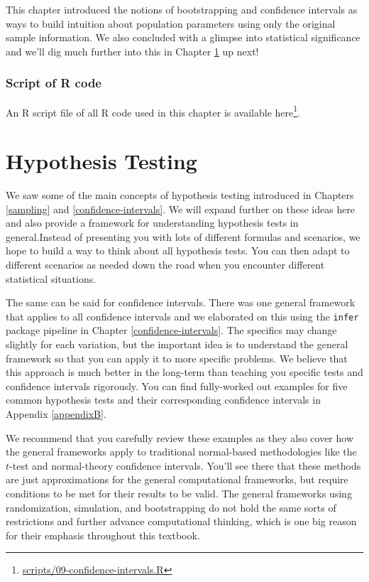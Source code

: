 \documentclass[12pt,]{krantz}
\renewcommand{\href}[2]{#2\footnote{\url{#1}}}
\begin{document}
This chapter introduced the notions of bootstrapping and confidence
intervals as ways to build intuition about population parameters using
only the original sample information. We also concluded with a glimpse
into statistical significance and we'll dig much further into this in
Chapter \ref{hypothesis-testing} up next!

\subsection{Script of R code}\label{script-of-r-code-6}

An R script file of all R code used in this chapter is available
\href{scripts/09-confidence-intervals.R}{here}.

\chapter{Hypothesis Testing}\label{hypothesis-testing}

We saw some of the main concepts of hypothesis testing introduced in
Chapters \ref{sampling} and \ref{confidence-intervals}. We will expand
further on these ideas here and also provide a framework for
understanding hypothesis tests in general.Instead of presenting you with
lots of different formulas and scenarios, we hope to build a way to
think about all hypothesis tests. You can then adapt to different
scenarios as needed down the road when you encounter different
statistical situations.

The same can be said for confidence intervals. There was one general
framework that applies to all confidence intervals and we elaborated on
this using the \texttt{infer} package pipeline in Chapter
\ref{confidence-intervals}. The specifics may change slightly for each
variation, but the important idea is to understand the general framework
so that you can apply it to more specific problems. We believe that this
approach is much better in the long-term than teaching you specific
tests and confidence intervals rigorously. You can find fully-worked out
examples for five common hypothesis tests and their corresponding
confidence intervals in Appendix \ref{appendixB}.

We recommend that you carefully review these examples as they also cover
how the general frameworks apply to traditional normal-based
methodologies like the \(t\)-test and normal-theory confidence
intervals. You'll see there that these methods are just approximations
for the general computational frameworks, but require conditions to be
met for their results to be valid. The general frameworks using
randomization, simulation, and bootstrapping do not hold the same sorts
of restrictions and further advance computational thinking, which is one
big reason for their emphasis throughout this textbook.
\end{document}
